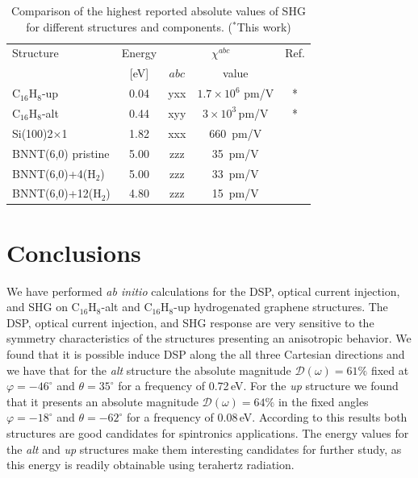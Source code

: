 \documentclass[pss]{wiley2sp} %
\begin{document}
\begin{table}[htb]%
\sidecaption
\begin{tabular}{lcccc}
\hline
\hline
Structure & \hspace{-5mm}Energy & \multicolumn{2}{c}{$\chi^{abc} $} &  Ref.\\
\cline{3-4} & \hspace{-5mm}[eV] & $abc$ & value \\
\hline
C$_{16}$H$_{8}$-up    &  0.04  & yxx   & $1.7\times10^{6}$ \scriptsize{pm/V}  & *     \\
C$_{16}$H$_{8}$-alt   &  0.44  & xyy   & $3\times10^{3}$\,\scriptsize{pm/V}  & *     \\
Si(100)2$\times$1     &  1.82  & xxx   & 660\, \scriptsize{pm/V}  & \cite{andersonPRB15}  \\
BNNT(6,0) pristine    &  5.00  & zzz   & 35\,  \scriptsize{pm/V}  & \cite{salazarPRB14} \\
BNNT(6,0)+4(H$_{2}$)  &  5.00  & zzz   & 33\,  \scriptsize{pm/V}  & \cite{salazarPRB14} \\
BNNT(6,0)+12(H$_{2}$) &  4.80  & zzz   & 15\,  \scriptsize{pm/V}  & \cite{salazarPRB14} \\
\hline
\hline
\end{tabular}
\caption[]{%
Comparison of the highest reported absolute values of SHG for 
different structures and components. ($^{*}$This work)}
\label{tab:shgcomp}
\end{table}


\section{Conclusions}\label{sec:conclusions}

We have performed \emph{ab initio} calculations for the DSP, optical current
injection, and SHG on C$_{16}$H$_{8}$-alt and C$_{16}$H$_{8}$-up hydrogenated
graphene structures. The DSP, optical current injection, and SHG response are
very sensitive to the symmetry characteristics of the structures presenting an
anisotropic behavior. We found that it is possible induce DSP along the all
three Cartesian directions and we have that for the \emph{alt} structure the
absolute magnitude $\mathcal{D}(\omega)=61\%$ fixed at $\varphi=-46^{\circ}$ and
$\theta=35^{\circ}$ for a frequency of 0.72\,eV. For the \emph{up} structure we
found that it presents an absolute magnitude $\mathcal{D}(\omega)=64\%$ in the
fixed angles $\varphi=-18^{\circ}$ and $\theta=-62^{\circ}$ for a frequency of
0.08\,eV. According to this results both structures are good candidates for
spintronics applications. The energy values for the \emph{alt} and \emph{up}
structures make them interesting candidates for further study, as this energy is
readily obtainable using terahertz radiation.
\end{document}
